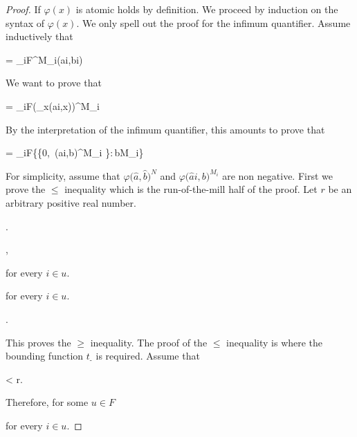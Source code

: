 \documentclass[12pt,letterpaper,oneside,reqno]{amsart}
\theoremstyle{plain}
\theoremstyle{remark}
\begin{document}
\begin{proof}
If $\varphi(x)$ is atomic holds by definition.
We proceed by induction on the syntax of $\varphi(x)$.
We only spell out the proof for the infimum quantifier.
Assume inductively that

{=}
{\lim_{i\uparrow F}\varphi^{M_i}\big(\hat ai,\hat bi\big)}

We want to prove that 

{=}
{\lim_{i\uparrow F}\Big(\bigwedge_x\varphi\big(\hat ai,x\big)\Big)^{M_i}}

By the interpretation of the infimum quantifier, this amounts to prove that

{=}
{\lim_{i\uparrow F}\inf\Big\{\max\big\{0,\ \varphi\big(\hat ai,b\big)^{M_i}
\big\}:\,b\in M_i\Big\}}

For simplicity, assume that $\varphi\big(\hat a,\hat b\big)^N$ and $\varphi\big(\hat ai,b\big)^{M_i}$ are non negative.
First we prove the $\le$ inequality which is the run-of-the-mill half of the proof.
Let $r$ be an arbitrary positive real number.

.

,

\quad for every $i\in u$.

\quad for every $i\in u$.

.

\smallskip
This proves the $\ge$ inequality.
The proof of the $\le$ inequality is where the bounding function $t_{\mbox{-}}$ is required.
Assume that
\smallskip

{<}
{r.}

Therefore, for some $u\in F$

\quad for every $i\in u$.


\end{proof}
\end{document}
